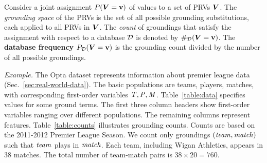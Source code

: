 \documentclass[conference]{IEEEtran}
\begin{document}
Consider a joint assignment 
$P(\boldsymbol{V} = \mathbf{v})$ of values to a set of PRVs $\boldsymbol{V}$. The {\em grounding space} of the PRVs is the set of all possible grounding substitutions, each applied to all PRVs in $\boldsymbol{V}$. The {\em count} of groundings that satisfy the assignment with respect to a database $\mathcal{D}$ is denoted by $\#_{\mathcal{D}}(\boldsymbol{V} = \mathbf{v})$. The \textbf{database frequency} $P_{\mathcal{D}}(\boldsymbol{V} = \mathbf{v})$ is the grounding count divided by the number of all possible groundings.
		
\emph{Example.} \label{sec:example}
%
The Opta dataset represents information about premier league data %
(Sec.~\ref{sec:real-world-data}). 
The basic populations are teams, players, matches, with 
corresponding first-order variables $\it{T}, \it{P}, \it{M}$. Table~\ref{table:data} specifies values for some ground terms. The first three column headers show first-order variables ranging over different populations. The remaining columns represent features. Table~\ref{table:counts} illustrates grounding counts. Counts are based on the 2011-2012 Premier League Season. We count only groundings $(\it{team},\it{match})$ such that $\it{team}$ plays in $\it{match}$. Each team, including Wigan Athletics, appears in 38 matches. The total number of team-match pairs is $38 \times 20 = 760$.


\end{document}
